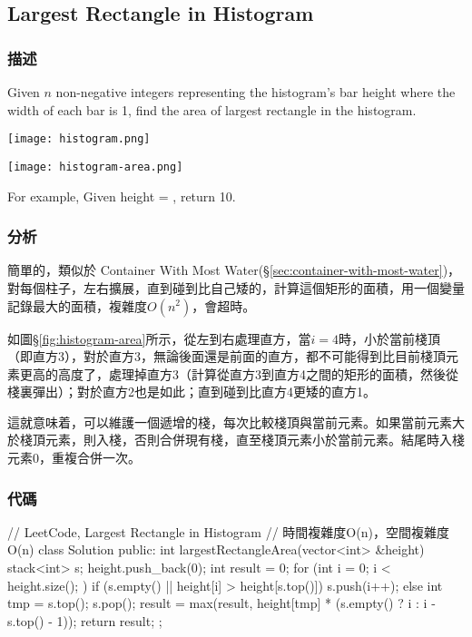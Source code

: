 \subsection{Largest Rectangle in Histogram} %
\label{sec:largest-rectangle-in-histogram}


\subsubsection{描述}
Given $n$ non-negative integers representing the histogram's bar height where the width of each bar is 1, find the area of largest rectangle in the histogram.

\begin{center}
\texttt{[image: histogram.png]}\\
\label{fig:histogram}
\end{center}

\begin{center}
\texttt{[image: histogram-area.png]}\\
\label{fig:histogram-area}
\end{center}

For example,
Given height = \fn{[2,1,5,6,2,3]},
return 10.


\subsubsection{分析}
簡單的，類似於 Container With Most Water(\S \ref{sec:container-with-most-water})，對每個柱子，左右擴展，直到碰到比自己矮的，計算這個矩形的面積，用一個變量記錄最大的面積，複雜度$O(n^2)$，會超時。

如圖\S \ref{fig:histogram-area}所示，從左到右處理直方，當$i=4$時，小於當前棧頂（即直方3），對於直方3，無論後面還是前面的直方，都不可能得到比目前棧頂元素更高的高度了，處理掉直方3（計算從直方3到直方4之間的矩形的面積，然後從棧裏彈出）；對於直方2也是如此；直到碰到比直方4更矮的直方1。

這就意味着，可以維護一個遞增的棧，每次比較棧頂與當前元素。如果當前元素大於棧頂元素，則入棧，否則合併現有棧，直至棧頂元素小於當前元素。結尾時入棧元素0，重複合併一次。


\subsubsection{代碼}
\begin{Code}
// LeetCode, Largest Rectangle in Histogram
// 時間複雜度O(n)，空間複雜度O(n)
class Solution {
public:
    int largestRectangleArea(vector<int> &height) {
        stack<int> s;
        height.push_back(0);
        int result = 0;
        for (int i = 0; i < height.size(); ) {
            if (s.empty() || height[i] > height[s.top()])
                s.push(i++);
            else {
                int tmp = s.top();
                s.pop();
                result = max(result,
                        height[tmp] * (s.empty() ? i : i - s.top() - 1));
            }
        }
        return result;
    }
};
\end{Code}


